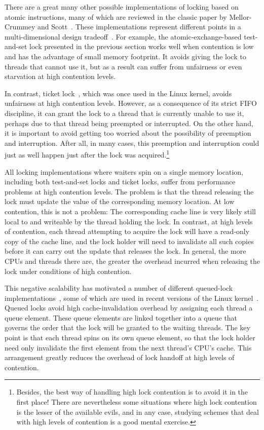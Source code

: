 There are a great many other possible implementations of locking based
on atomic instructions, many of which are reviewed in the classic paper
by Mellor-Crummey and Scott~\cite{MellorCrummey91a}.
These implementations represent different points in a multi-dimensional
design tradeoff~\cite{Guerraoui:2019:LPA:3319851.3301501,HugoGuirouxPhD,McKenney96a}.
For example,
the atomic-exchange-based test-and-set lock presented in the previous
section works well when contention is low and has the advantage
of small memory footprint.
It avoids giving the lock to threads that cannot use it, but as
a result can suffer from unfairness or even starvation at high
contention levels.

In contrast, ticket lock~\cite{MellorCrummey91a}, which was once used
in the Linux kernel, avoids unfairness at high contention levels.
However, as a consequence of its strict FIFO discipline, it can grant
the lock to a thread that is currently unable to use it, perhaps due
to that thread being preempted or interrupted.
On the other hand, it is important to avoid getting too worried about the
possibility of preemption and interruption.
After all, in many cases, this preemption and interruption could just
as well happen just after the lock was
acquired.\footnote{
	Besides, the best way of handling high lock contention is to avoid
	it in the first place!
	There are nevertheless some situations where high lock contention
	is the lesser of the available evils, and in any case, studying
	schemes that deal with high levels of contention is a good mental
	exercise.}

All locking implementations where waiters spin on a single memory
location, including both test-and-set locks and ticket locks,
suffer from performance problems at high contention levels.
The problem is that the thread releasing the lock must update the
value of the corresponding memory location.
At low contention, this is not a problem: The corresponding cache line
is very likely still local to and writeable by the thread holding
the lock.
In contrast, at high levels of contention, each thread attempting to
acquire the lock will have a read-only copy of the cache line, and
the lock holder will need to invalidate all such copies before it
can carry out the update that releases the lock.
In general, the more CPUs and threads there are, the greater the
overhead incurred when releasing the lock under conditions of
high contention.

This negative scalability has motivated a number of different
queued-lock
implementations~\cite{Anderson90,Graunke90,MellorCrummey91a,Wisniewski94,Craig93,Magnusson94,Takada93},
some of which are used in recent versions of the Linux
kernel~\cite{JonathanCorbet2014qspinlocks}.
Queued locks avoid high cache-invalidation overhead by assigning each
thread a queue element.
These queue elements are linked together into a queue that governs the
order that the lock will be granted to the waiting threads.
The key point is that each thread spins on its own queue element,
so that the lock holder need only invalidate the first element from
the next thread's CPU's cache.
This arrangement greatly reduces the overhead of lock handoff at high
levels of contention.

